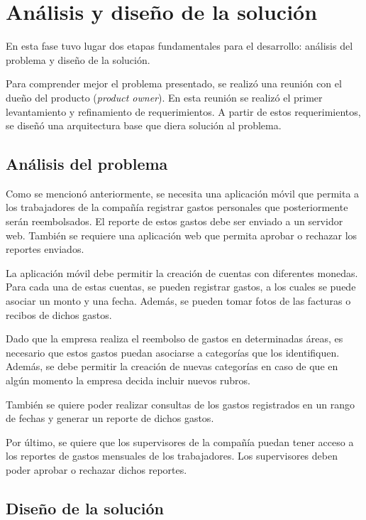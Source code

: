 \section{Análisis y diseño de la solución} \label{sect:Diseno}

En esta fase tuvo lugar dos etapas fundamentales para el desarrollo: análisis del problema y diseño de la solución.

Para comprender mejor el problema presentado, se realizó una reunión con el dueño del producto (\textit{product owner}). En esta reunión se realizó el primer levantamiento y refinamiento de requerimientos. A partir de estos requerimientos, se diseñó una arquitectura base que diera solución al problema.


\subsection{Análisis del problema}

Como se mencionó anteriormente, se necesita una aplicación móvil que permita a los trabajadores de la compañía registrar gastos personales que posteriormente serán reembolsados. El reporte de estos gastos debe ser enviado a un servidor web. También se requiere una aplicación web que permita aprobar o rechazar los reportes enviados.

La aplicación móvil debe permitir la creación de cuentas con diferentes monedas. Para cada una de estas cuentas, se pueden registrar gastos, a los cuales se puede asociar un monto y una fecha. Además, se pueden tomar fotos de las facturas o recibos de dichos gastos.

Dado que la empresa realiza el reembolso de gastos en determinadas áreas, es necesario que estos gastos puedan asociarse a categorías que los identifiquen. Además, se debe permitir la creación de nuevas categorías en caso de que en algún momento la empresa decida incluir nuevos rubros.

También se quiere poder realizar consultas de los gastos registrados en un rango de fechas y generar un reporte de dichos gastos.

Por último, se quiere que los supervisores de la compañía puedan tener acceso a los reportes de gastos mensuales de los trabajadores. Los supervisores deben poder aprobar o rechazar dichos reportes.

\subsection{Diseño de la solución}

